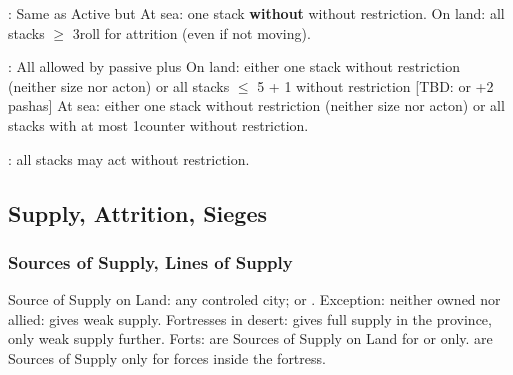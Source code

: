 \ducats: Same as Active but
\bparag At sea: one stack \textbf{without} \FLEET without restriction.
\bparag On land: all stacks $\geq$ 3\LD roll for attrition (even if not moving).

\ducats: All allowed by passive plus
\bparag On land: either one stack without restriction (neither size nor acton)
or all stacks $\leq$ 5 \LD + 1 \Pasha without restriction  [TBD: or +2 pashas]
\bparag At sea: either one stack without restriction (neither size nor acton)
or all stacks with at most 1\FLEET counter without restriction.

\ducats: all stacks may act without restriction.


\subsection{Supply, Attrition, Sieges}
\subsubsection{Sources of Supply, Lines of Supply}

\bparag Source of Supply on Land: any controled city; \TP or \COL.  Exception:
neither owned nor allied: gives weak supply.  Fortresses in desert: gives full
supply in the province, only weak supply further.
\bparag Forts: are Sources of Supply on Land for \LD or \LDE only.
\bparag \Presidios are Sources of Supply only for forces inside the fortress.

